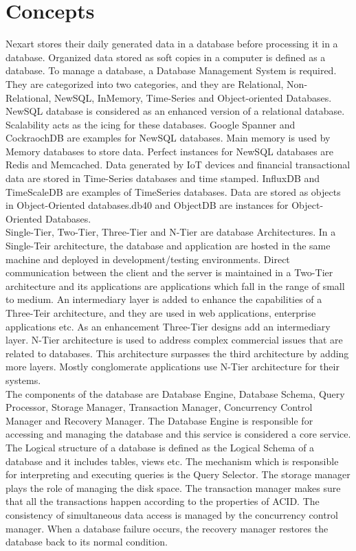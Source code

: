 \documentclass[a4Paper,12pt]{report}
\begin{document}
\section{Concepts}
Nexart stores their daily generated data in a database before processing it in a database. Organized data stored as soft copies in a computer is defined as a database. To manage a database, a Database Management System is required.\\[12pt]
They are categorized into two categories, and they are Relational, Non-Relational, NewSQL, InMemory, Time-Series and Object-oriented Databases. NewSQL database is considered as an enhanced version of a relational database. Scalability acts as the icing for these databases. Google Spanner and CockraochDB are examples for NewSQL databases. Main memory is used by Memory databases to store data. Perfect instances for NewSQL databases are Redis and Memcached. Data generated by IoT devices and financial transactional data are stored in Time-Series databases and time stamped. InfluxDB and TimeScaleDB are examples of TimeSeries databases. Data are stored as objects in Object-Oriented databases.db40 and ObjectDB are instances for Object-Oriented Databases.\\[12pt]
Single-Tier, Two-Tier, Three-Tier and N-Tier are database Architectures. In a Single-Teir architecture, the database and application are hosted in the same machine and deployed in development/testing environments. Direct communication between the client and the server is maintained in a Two-Tier architecture and its applications are applications which fall in the range of small to medium. An intermediary layer is added to enhance the capabilities of a Three-Teir architecture, and they are used in web applications, enterprise applications etc. As an enhancement Three-Tier designs add an intermediary layer. N-Tier architecture is used to address complex commercial issues that are related to databases. This architecture surpasses the third architecture by adding more layers. Mostly conglomerate applications use N-Tier architecture for their systems.\\[12pt]
The components of the database are Database Engine, Database Schema, Query Processor, Storage Manager, Transaction Manager, Concurrency Control Manager and Recovery Manager. The Database Engine is responsible for accessing and managing the database and this service is considered a core service. The Logical structure of a database is defined as the Logical Schema of a database and it includes tables, views etc. The mechanism which is responsible for interpreting and executing queries is the Query Selector. The storage manager plays the role of managing the disk space. The transaction manager makes sure that all the transactions happen according to the properties of ACID. The consistency of simultaneous data access is managed by the concurrency control manager. When a database failure occurs, the recovery manager restores the database back to its normal condition.\\[12pt]
\end{document}
